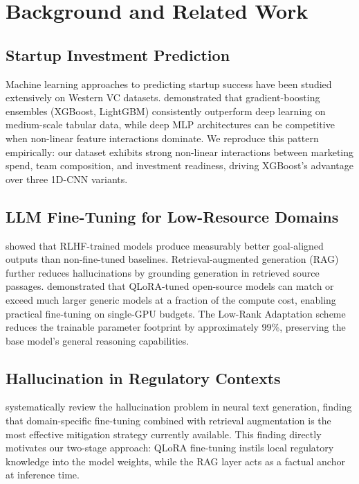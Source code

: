 \documentclass{article}
\begin{document}
\FloatBarrier
\section{Background and Related Work}

\FloatBarrier
\subsection{Startup Investment Prediction}

Machine learning approaches to predicting startup success have been studied
extensively on Western VC datasets.
\citet{grinsztajn2022tabular} demonstrated that gradient-boosting ensembles
(XGBoost, LightGBM) consistently outperform deep learning on medium-scale
tabular data, while deep MLP architectures can be competitive when
non-linear feature interactions dominate.
We reproduce this pattern empirically: our dataset exhibits strong
non-linear interactions between marketing spend, team composition, and
investment readiness, driving XGBoost's advantage over three 1D-CNN variants.

\FloatBarrier
\subsection{LLM Fine-Tuning for Low-Resource Domains}

\citet{ouyang2022instructgpt} showed that RLHF-trained models produce
measurably better goal-aligned outputs than non-fine-tuned baselines.
Retrieval-augmented generation (RAG)~\citep{lewis2020rag} further reduces
hallucinations by grounding generation in retrieved source passages.
\citet{dettmers2023qlora} demonstrated that QLoRA-tuned open-source models
can match or exceed much larger generic models at a fraction of the compute
cost, enabling practical fine-tuning on single-GPU budgets.
The Low-Rank Adaptation scheme~\citep{hu2022lora} reduces the trainable
parameter footprint by approximately 99\%, preserving the base model's
general reasoning capabilities.

\FloatBarrier
\subsection{Hallucination in Regulatory Contexts}

\citet{ji2023hallucination} systematically review the hallucination problem
in neural text generation, finding that domain-specific fine-tuning combined
with retrieval augmentation is the most effective mitigation strategy currently
available.
This finding directly motivates our two-stage approach: QLoRA fine-tuning
instils local regulatory knowledge into the model weights, while the RAG
layer acts as a factual anchor at inference time.
\end{document}
